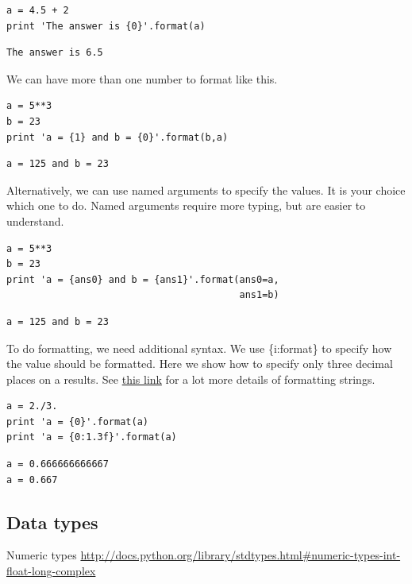 \documentclass[11pt]{article}
\begin{document}
\begin{verbatim}
a = 4.5 + 2
print 'The answer is {0}'.format(a)
\end{verbatim}

\begin{verbatim}
The answer is 6.5
\end{verbatim}


We can have more than one number to format like this.
\begin{verbatim}
a = 5**3
b = 23
print 'a = {1} and b = {0}'.format(b,a)
\end{verbatim}

\begin{verbatim}
a = 125 and b = 23
\end{verbatim}

Alternatively, we can use named arguments to specify the values. It is your choice which one to do. Named arguments require more typing, but are easier to understand.
\begin{verbatim}
a = 5**3
b = 23
print 'a = {ans0} and b = {ans1}'.format(ans0=a,
                                         ans1=b)
\end{verbatim}

\begin{verbatim}
a = 125 and b = 23
\end{verbatim}

To do formatting, we need additional syntax. We use \{i:format\} to specify how the value should be formatted. Here we show how to specify only three decimal places on a results. See \href{http://docs.python.org/library/stdtypes.html\#string-formatting-operations}{this link} for a lot more details of formatting strings.
\begin{verbatim}
a = 2./3.
print 'a = {0}'.format(a)
print 'a = {0:1.3f}'.format(a)
\end{verbatim}

\begin{verbatim}
a = 0.666666666667
a = 0.667
\end{verbatim}


\subsection{Data types}
\label{sec:org29129a5}
Numeric types \url{http://docs.python.org/library/stdtypes.html\#numeric-types-int-float-long-complex}
\end{document}
